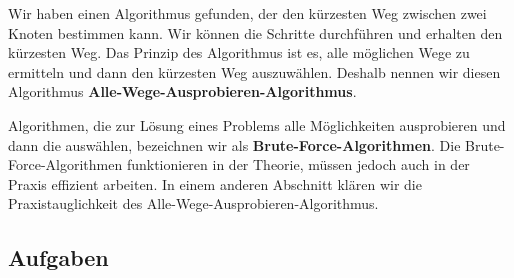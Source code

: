 Wir haben einen Algorithmus gefunden, der den kürzesten Weg zwischen zwei Knoten bestimmen kann. Wir können die Schritte durchführen und erhalten den kürzesten Weg. Das Prinzip des Algorithmus ist es, alle möglichen Wege zu ermitteln und dann den kürzesten Weg auszuwählen. Deshalb nennen wir diesen Algorithmus \textbf{Alle-Wege-Ausprobieren-Algorithmus}.

Algorithmen, die zur Lösung eines Problems alle Möglichkeiten ausprobieren und dann die  auswählen, bezeichnen wir als \textbf{Brute-Force-Algorithmen}. Die Brute-Force-Algorithmen funktionieren in der Theorie, müssen jedoch auch in der Praxis effizient arbeiten. In einem anderen Abschnitt klären wir die Praxistauglichkeit des Alle-Wege-Ausprobieren-Algorithmus.

\subsection{Aufgaben}
\label{subsection-aufgaben-routenplaner-brute-force}

